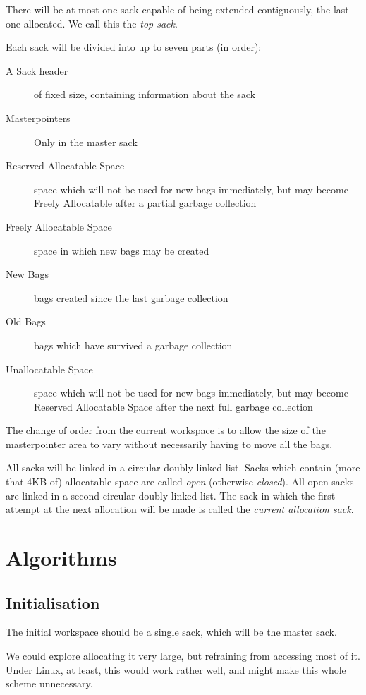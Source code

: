 \documentclass[12pt]{article}
\newcommand{\bd}{\begin{description}}
\newcommand{\ed}{\end{description}}
\begin{document}
There will be at most one sack capable of being extended
contiguously, the last one allocated. We call this the \emph{top sack}. 

Each sack will be divided into up to seven parts (in order):
\bd
\item[A Sack header] of fixed size, containing information about the sack
\item[Masterpointers] Only in the master sack
\item[Reserved Allocatable Space] space which will not be used for new 
bags immediately, but may become Freely Allocatable after a partial
garbage collection
\item[Freely Allocatable Space] space in which new bags may be created
\item[New Bags] bags created since the last garbage collection
\item[Old Bags] bags which have survived a garbage collection
\item[Unallocatable Space] space which will not be used for new 
bags immediately, but may become Reserved Allocatable Space after the
next full garbage collection
\ed

The change of order from the current workspace is to allow the size of 
the masterpointer area to vary without necessarily having to move all
the bags.

All sacks will be linked in a circular doubly-linked list.  Sacks
which contain (more that 4KB of) allocatable space are called
\emph{open} (otherwise \emph{closed}). All open sacks are linked in a
second circular doubly linked list. The sack in which the first
attempt at the next allocation will be made is called the
\emph{current allocation sack}.




\section{Algorithms}

\subsection{Initialisation}

The initial workspace should be a single sack, which will be the
master sack. 

We could explore allocating it very large, but refraining 
from accessing most of it. Under Linux, at least, this would work
rather well, and might make this whole scheme unnecessary.
\end{document}
